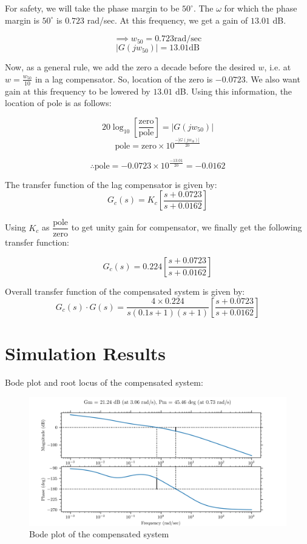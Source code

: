 \documentclass[12pt]{article}
\begin{document}
For safety, we will take the phase margin to be $50^\circ$. The $\omega$ for
which the phase margin is $50^\circ$ is $0.723$ rad/sec. At this frequency, we
get a gain of $13.01$ dB.

$$\implies w_{50} = 0.723 \text{rad/sec}$$
$$|G(jw_{50})| = 13.01 \text{dB}$$

\noindent Now, as a general rule, we add the zero a decade before the desired $w$, i.e.
at $w=\frac{w_{50}}{10}$ in a lag compensator. So, location of the zero is $-0.0723$. We also want gain at this frequency to be lowered by $13.01$ dB. Using this information, the location of pole is as follows:

$$20\log_{10}\left[{\dfrac{\text{zero}}{\text{pole}}}\right] = |G(jw_{50})|$$
$$\text{pole} = \text{zero}\times10^{\tfrac{-|G(jw_{50})|}{20}}$$

$$\therefore \text{pole}= -0.0723\times10^{\tfrac{-13.01}{20}} = -0.0162 $$

\noindent The transfer function of the lag compensator is given by:
$$G_c(s) = K_c\left[\dfrac{s+0.0723}{s+0.0162}\right]$$

Using $K_c$ as $\dfrac{\text{pole}}{\text{zero}}$ to get unity gain for
compensator, we finally get the following transfer function:

$$G_c(s) = 0.224\left[\dfrac{s+0.0723}{s+0.0162}\right]$$

Overall transfer function of the compensated system is given by: $$G_c(s) \cdot
    G(s) =
    \dfrac{4\times0.224}{s(0.1s+1)(s+1)}\left[\dfrac{s+0.0723}{s+0.0162}\right]$$

\section{Simulation Results}
Bode plot and root locus of the compensated system:
\begin{figure}[h!]
    \centering
    \includegraphics[width=0.8\linewidth]{bode_compensated.png}
    \caption {Bode plot of the compensated system}
    \label{fig:bode_compensated}
\end{figure}
\end{document}
